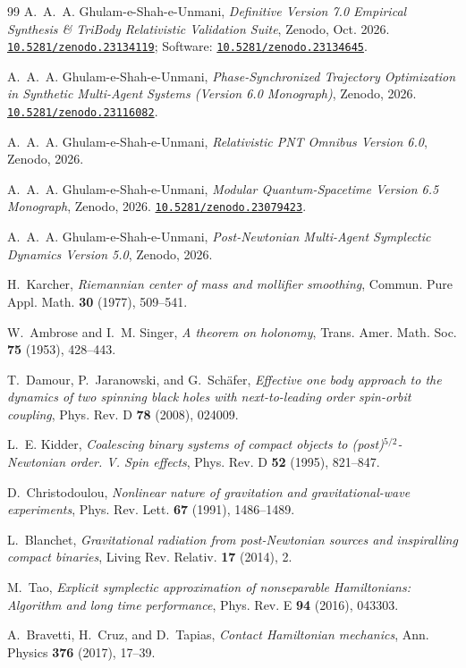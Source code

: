\documentclass[11pt,a4paper,reqno]{article}
\newcommand{\zenodo}[1]{\href{https://doi.org/10.5281/zenodo.#1}{\texttt{10.5281/zenodo.#1}}}
\theoremstyle{plain}
\theoremstyle{definition}
\theoremstyle{remark}
\numberwithin{equation}{section}
\begin{document}
\begin{thebibliography}{99}
A.~A.~A. Ghulam-e-Shah-e-Unmani, \emph{Definitive Version 7.0 Empirical Synthesis \& TriBody Relativistic Validation Suite}, Zenodo, Oct. 2026. \zenodo{23134119}; Software: \zenodo{23134645}.

A.~A.~A. Ghulam-e-Shah-e-Unmani, \emph{Phase-Synchronized Trajectory Optimization in Synthetic Multi-Agent Systems (Version 6.0 Monograph)}, Zenodo, 2026. \zenodo{23116082}.

A.~A.~A. Ghulam-e-Shah-e-Unmani, \emph{Relativistic PNT Omnibus Version 6.0}, Zenodo, 2026.

A.~A.~A. Ghulam-e-Shah-e-Unmani, \emph{Modular Quantum-Spacetime Version 6.5 Monograph}, Zenodo, 2026. \zenodo{23079423}.

A.~A.~A. Ghulam-e-Shah-e-Unmani, \emph{Post-Newtonian Multi-Agent Symplectic Dynamics Version 5.0}, Zenodo, 2026.

H.~Karcher, \emph{Riemannian center of mass and mollifier smoothing}, Commun. Pure Appl. Math. \textbf{30} (1977), 509--541.

W.~Ambrose and I.~M. Singer, \emph{A theorem on holonomy}, Trans. Amer. Math. Soc. \textbf{75} (1953), 428--443.

T.~Damour, P.~Jaranowski, and G.~Sch\"afer, \emph{Effective one body approach to the dynamics of two spinning black holes with next-to-leading order spin-orbit coupling}, Phys. Rev. D \textbf{78} (2008), 024009.

L.~E. Kidder, \emph{Coalescing binary systems of compact objects to (post)$^{5/2}$-Newtonian order. V. Spin effects}, Phys. Rev. D \textbf{52} (1995), 821--847.

D.~Christodoulou, \emph{Nonlinear nature of gravitation and gravitational-wave experiments}, Phys. Rev. Lett. \textbf{67} (1991), 1486--1489.

L.~Blanchet, \emph{Gravitational radiation from post-Newtonian sources and inspiralling compact binaries}, Living Rev. Relativ. \textbf{17} (2014), 2.

M.~Tao, \emph{Explicit symplectic approximation of nonseparable Hamiltonians: Algorithm and long time performance}, Phys. Rev. E \textbf{94} (2016), 043303.

A.~Bravetti, H.~Cruz, and D.~Tapias, \emph{Contact Hamiltonian mechanics}, Ann. Physics \textbf{376} (2017), 17--39.


\end{thebibliography}
\end{document}
